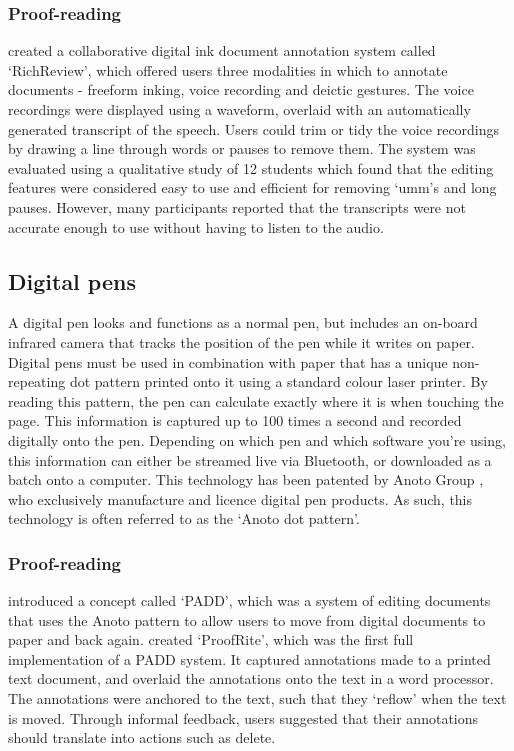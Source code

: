 \subsubsection{Proof-reading}

\citet{Yoon2014} created a collaborative digital ink document annotation system called `RichReview', which offered
users three modalities in which to annotate documents - freeform inking, voice recording and deictic gestures. The
voice recordings were displayed using a waveform, overlaid with an automatically generated transcript of the speech.
Users could trim or tidy the voice recordings by drawing a line through words or pauses to remove them.  The system was
evaluated using a qualitative study of 12 students which found that the editing features were considered easy to use
and efficient for removing `umm's and long pauses.  However, many participants reported that the transcripts were not
accurate enough to use without having to listen to the audio.

\subsection{Digital pens}
A digital pen looks and functions as a normal pen, but includes an on-board infrared camera that tracks the position of
the pen while it writes on paper. Digital pens must be used in combination with paper that has a unique non-repeating
dot pattern printed onto it using a standard colour laser printer.  By reading this pattern, the pen can calculate
exactly where it is when touching the page. This information is captured up to 100 times a second and recorded
digitally onto the pen. Depending on which pen and which software you're using, this information can either be streamed
live via Bluetooth, or downloaded as a batch onto a computer. This technology has been patented by Anoto Group
\citep{Fahraeus2003}, who exclusively manufacture and licence digital pen products. As such, this technology is often
referred to as the `Anoto dot pattern'.


\subsubsection{Proof-reading}

\citet{Guimbretiere2003} introduced a concept called `PADD', which was a system of editing documents that uses the
Anoto pattern to allow users to move from digital documents to paper and back again. \citet{Conroy2004} created
`ProofRite', which was the first full implementation of a PADD system. It captured annotations made to a printed text
document, and overlaid the annotations onto the text in a word processor. The annotations were anchored to the text,
such that they `reflow' when the text is moved. Through informal feedback, users suggested that their annotations
should translate into actions such as delete.

